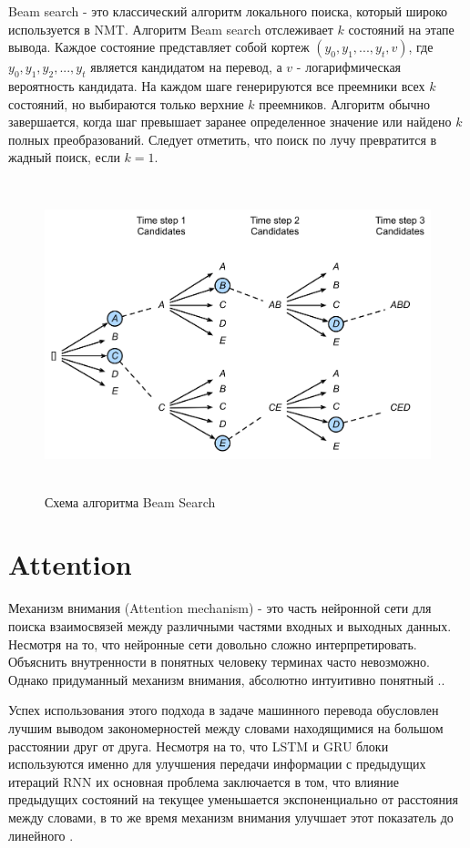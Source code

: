 	Beam search - это классический алгоритм локального поиска, который широко используется в NMT. Алгоритм Beam search отслеживает $k$ состояний на этапе вывода. Каждое состояние представляет собой кортеж $(y_0, y_1, ..., y_t, v)$, где $y_0, y_1, y_2, ..., y_t$ является кандидатом на перевод, а $v$ - логарифмическая вероятность кандидата. На каждом шаге генерируются все преемники всех $k$ состояний, но выбираются только верхние $k$ преемников. Алгоритм обычно завершается, когда шаг превышает заранее определенное значение или найдено $k$ полных преобразований. Следует отметить, что поиск по лучу превратится в жадный поиск, если $k = 1$.
	
	\begin{figure}[ht!]
		\centering
		\captionsetup{justification=centering}
		\includegraphics[height=90mm]{img/beam-search.png}
		\caption{Схема алгоритма Beam Search}
	\end{figure}
	
	\section{Attention}
	
	Механизм внимания (Attention mechanism) - это часть нейронной сети для поиска взаимосвязей между различными частями входных и выходных данных. Несмотря на то, что нейронные сети довольно сложно интерпретировать. Объяснить внутренности в понятных человеку терминах часто невозможно. Однако придуманный механизм внимания, абсолютно интуитивно понятный \cite{16}..
    
    Успех использования этого подхода в задаче машинного перевода обусловлен лучшим выводом закономерностей между словами находящимися на большом расстоянии друг от друга. Несмотря на то, что LSTM и GRU блоки используются именно для улучшения передачи информации с предыдущих итераций RNN их основная проблема заключается в том, что влияние предыдущих состояний на текущее уменьшается экспоненциально от расстояния между словами, в то же время механизм внимания улучшает этот показатель до линейного \cite{17}.
    
